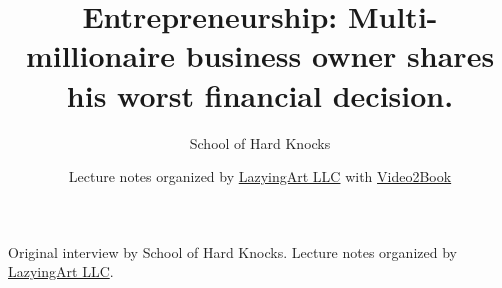 \documentclass[11pt,oneside]{book}
\begin{document}
\frontmatter
\title{Entrepreneurship: Multi-millionaire business owner shares his worst financial decision.}
\author{School of Hard Knocks}
\date{Lecture notes organized by \href{https://lazying.art}{LazyingArt LLC} with \href{https://github.com/lachlanchen/Video2Book}{Video2Book}}
\maketitle
\begin{center}
\small Original interview by School of Hard Knocks. Lecture notes organized by \href{https://lazying.art}{LazyingArt LLC}.
\end{center}
\clearpage
\mainmatter

\end{document}
